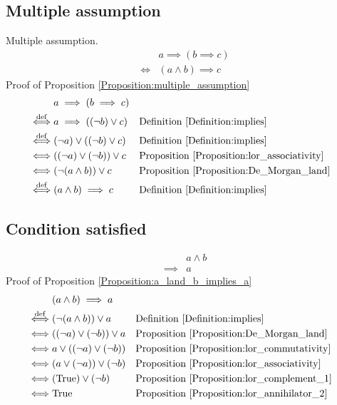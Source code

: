 \subsection{Multiple assumption}
\begin{prop}
\label{Proposition:multiple_assumption}
Multiple assumption.
\begin{align*}
& a \implies (b \implies c) \\
\iff & (a \land b) \implies c
\end{align*}
Proof of Proposition \ref{Proposition:multiple_assumption}
\begin{align*}
& a \implies (b \implies c) \\
\overset{\operatorname{def}}{\iff} & a \implies ((\lnot b) \lor c)
& & \text{Definition \ref{Definition:implies}} \\
\overset{\operatorname{def}}{\iff} & (\lnot a) \lor ((\lnot b) \lor c)
& & \text{Definition \ref{Definition:implies}} \\
\iff & ((\lnot a) \lor (\lnot b)) \lor c
& & \text{Proposition \ref{Proposition:lor_associativity}} \\
\iff & (\lnot (a \land b)) \lor c
& & \text{Proposition \ref{Proposition:De_Morgan_land}} \\
\overset{\operatorname{def}}{\iff} & (a \land b) \implies c
& & \text{Definition \ref{Definition:implies}} \\
\end{align*}
\end{prop}

\subsection{Condition satisfied}
\begin{prop}
\label{Proposition:a_land_b_implies_a}
\begin{align*}
& a \land b \\
\implies & a
\end{align*}
Proof of Proposition \ref{Proposition:a_land_b_implies_a}
\begin{align*}
& (a \land b) \implies a \\
\overset{\operatorname{def}}{\iff} & (\lnot (a \land b)) \lor a
& & \text{Definition \ref{Definition:implies}} \\
\iff & ((\lnot a) \lor (\lnot b)) \lor a
& & \text{Proposition \ref{Proposition:De_Morgan_land}} \\
\iff & a \lor ((\lnot a) \lor (\lnot b))
& & \text{Proposition \ref{Proposition:lor_commutativity}} \\
\iff & (a \lor (\lnot a)) \lor (\lnot b)
& & \text{Proposition \ref{Proposition:lor_associativity}} \\
\iff & (\text{True}) \lor (\lnot b)
& & \text{Proposition \ref{Proposition:lor_complement_1}} \\
\iff & \text{True}
& & \text{Proposition \ref{Proposition:lor_annihilator_2}} \\
\end{align*}
\end{prop}

